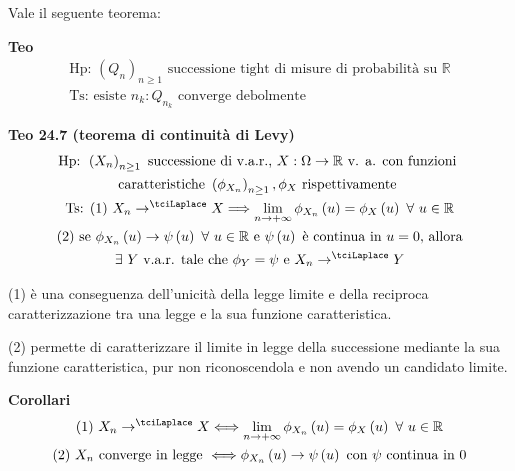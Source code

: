 \documentclass{article}
\begin{document}
Vale il seguente teorema:

\textbf{Teo}%
\begin{gather*}
\text{Hp: }\left( Q_{n}\right) _{n\geq 1}\text{ successione tight di misure
di probabilit\`{a} su }%
\mathbb{R}
\\
\text{Ts: esiste }n_{k}:Q_{n_{k}}\text{ converge debolmente}
\end{gather*}

\textbf{Teo 24.7 (teorema di continuit\`{a} di Levy)}%
\begin{gather*}
\text{Hp}\text{: }\left( X_{n}\right) _{n\geq 1}\text{ successione di
v.a.r., }X:\Omega \rightarrow 
\mathbb{R}
\text{ v. a. con funzioni } \\
\text{caratteristiche }\left( \phi _{X_{n}}\right) _{n\geq 1},\phi _{X}\text{
rispettivamente } \\
\text{Ts}\text{: (1) }X_{n}\rightarrow ^{\tciLaplace }X\Longrightarrow
\lim_{n\rightarrow +\infty }\phi _{X_{n}}\left( u\right) =\phi _{X}\left(
u\right) \text{ }\forall \text{ }u\in 
\mathbb{R}
\\
\text{(2) se }\phi _{X_{n}}\left( u\right) \rightarrow \psi \left( u\right) 
\text{ }\forall \text{ }u\in 
\mathbb{R}
\text{ e }\psi \left( u\right) \text{ \`{e} continua in }u=0\text{, allora}
\\
\exists \text{ }Y\text{ v.a.r. tale che }\phi _{Y}=\psi \text{ e }%
X_{n}\rightarrow ^{\tciLaplace }Y
\end{gather*}

(1) \`{e} una conseguenza dell'unicit\`{a} della legge limite e della
reciproca caratterizzazione tra una legge e la sua funzione caratteristica.

(2) permette di caratterizzare il limite in legge della successione mediante
la sua funzione caratteristica, pur non riconoscendola e non avendo un
candidato limite.

\textbf{Corollari}%
\begin{gather*}
\text{(1) }X_{n}\rightarrow ^{\tciLaplace }X\Longleftrightarrow
\lim_{n\rightarrow +\infty }\phi _{X_{n}}\left( u\right) =\phi _{X}\left(
u\right) \text{ }\forall \text{ }u\in 
\mathbb{R}
\\
\text{(2) }X_{n}\text{ converge in legge }\Longleftrightarrow \phi
_{X_{n}}\left( u\right) \rightarrow \psi \left( u\right) \text{ con }\psi 
\text{ continua in }0
\end{gather*}
\end{document}
